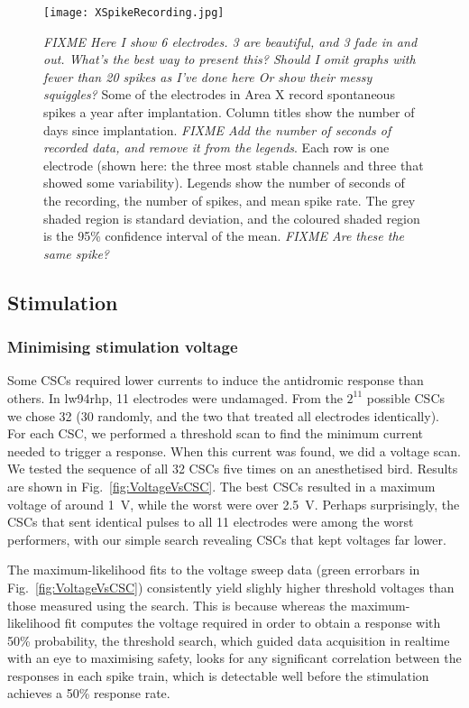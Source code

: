 \documentclass[10pt,letterpaper]{article}
\newcommand\fig[1]{Fig.~\ref{#1}}
\begin{document}
\begin{figure}
  \texttt{[image: XSpikeRecording.jpg]}
  \caption{{\em FIXME Here I show 6 electrodes.  3 are beautiful, and
      3 fade in and out.  What's the best way to present this?  Should
      I omit graphs with fewer than 20 spikes as I've done here Or
      show their messy squiggles?}  Some of the electrodes in Area X
    record spontaneous spikes a year after implantation.  Column
    titles show the number of days since implantation. {\em FIXME Add the number of seconds of
    recorded data, and remove it from the legends}.  Each row is one electrode (shown here: the three
    most stable channels and three that showed some variability).
    Legends show the number of seconds of the recording, the number of
    spikes, and mean spike rate.  The grey shaded region is standard
    deviation, and the coloured shaded region is the 95\% confidence
    interval of the mean. {\em FIXME Are these the same spike?}}
  \label{fig:XSpikeRecording}
\end{figure}




\subsection{Stimulation}

\subsubsection{Minimising stimulation voltage}

Some CSCs required lower currents to induce the antidromic response
than others. In lw94rhp, 11 electrodes were undamaged. From the
$2^{11}$ possible CSCs we chose 32 (30 randomly, and the two that
treated all electrodes identically).  For each CSC, we performed a
threshold scan to find the minimum current needed to trigger a
response.  When this current was found, we did a voltage scan.  We
tested the sequence of all 32 CSCs five times on an anesthetised bird.  Results are shown
in \fig{fig:VoltageVsCSC}.  The best CSCs resulted in a maximum
voltage of around 1~V, while the worst were over 2.5~V.  Perhaps
surprisingly, the CSCs that sent identical pulses to all 11 electrodes
were among the worst performers, with our simple search revealing CSCs
that kept voltages far lower.

The maximum-likelihood fits to the voltage sweep data (green errorbars
in \fig{fig:VoltageVsCSC}) consistently yield slighly higher threshold
voltages than those measured using the search.  This is because
whereas the maximum-likelihood fit computes the voltage required in
order to obtain a response with 50\% probability, the threshold
search, which guided data acquisition in realtime with an eye to maximising safety, looks for any
significant correlation between the responses in each spike train,
which is detectable well before the stimulation achieves a 50\%
response rate.
\end{document}
